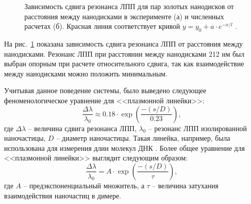 \begin{figure}[t]
\caption{Зависимость сдвига резонанса ЛПП для пар золотых нанодисков от расстояния между нанодисками в эксперименте (а) и численных расчетах (б). Красная линия соответствует кривой $ y = y_0 + a \cdot e^{-x/l} $  \cite{plasonrulereq}.}
\label{img:PR_ruler}
\end{figure}

На рис.~\ref{img:PR_ruler} показана зависимость сдвига резонанса ЛПП от расстояния между нанодисками. Резонанс ЛПП при расстоянии между нанодисками 212 нм был выбран опорным при расчете относительного сдвига, так как взаимодействие между нанодисками можно положить минимальным.

Учитывая данное поведение системы, было выведено следующее феноменологическое уравнение для <<плазмонной линейки>>:
\begin{equation}
\frac{\Delta \lambda}{\lambda_0} \approx 0.18 \cdot \exp \left( \frac{-(s/D)}{0.23} \right),
\label{eq:plasmon_ruler}
\end{equation}
где $ \Delta \lambda $ -- величина сдвига резонанса ЛПП, $ \lambda_0 $ -- резонанс ЛПП изолированной наночастицы, $ D $ -- диаметр наночастицы. Такая линейка, например, была использована для измерения длин молекул ДНК \cite{bioplasmonruler3}. Более общее уравнение для <<плазмонной линейки>> выглядит следующим образом:
\begin{equation}
\frac{\Delta \lambda}{\lambda_0} = A \cdot \exp \left( \frac{-(s/D)}{\tau} \right),
\label{eq:ruler_general}
\end{equation}
где $ A $ -- предэкспоненциальный множитель, а $ \tau $ -- величина затухания взаимодействия наночастиц в димере.

